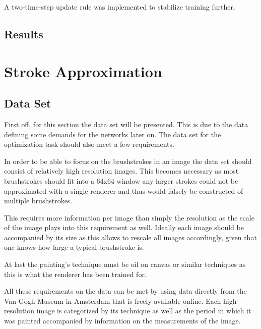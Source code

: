 A two-time-step update rule was implemented to stabilize training further.

\subsection{Results}


\section{Stroke Approximation}

\subsection{Data Set}
First off, for this section the data set will be presented.
This is due to the data defining some demands for the networks later on.
The data set for the optimization task should also meet a few requirements.

In order to be able to focus on the brushstrokes in an image the data set should consist of relatively high resolution images.
This becomes necessary as most brushstrokes should fit into a 64x64 window any larger strokes could not be approximated with a single renderer and thus would falsely be constructed of multiple brushstrokes.

This requires more information per image than simply the resolution as the scale of the image plays into this requirement as well.
Ideally each image should be accompanied by its size as this allows to rescale all images accordingly, given that one knows how large a typical brushstroke is.

At last the painting's technique must be oil on canvas or similar techniques as this is what the renderer has been trained for.

All these requirements on the data can be met by using data directly from the Van Gogh Museum in Amsterdam that is freely available online.
Each high resolution image is categorized by its technique as well as the period in which it was painted accompanied by information on the measurements of the image.

